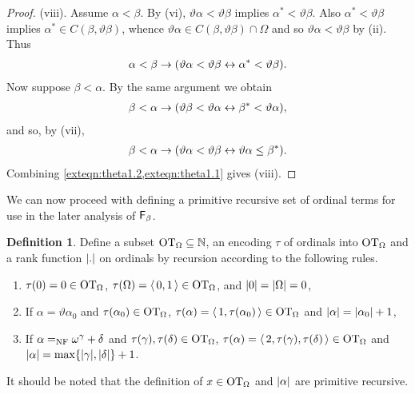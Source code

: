 \documentclass[UKenglish,cleveref,DIV=12]{scrartcl}
\theoremstyle{definition}
\newtheorem{definition}[lemma]{Definition}
\theoremstyle{definition}
\begin{document}
\begin{proof}
(viii). Assume $\alpha<\beta$. By (vi), $\vartheta\alpha<\vartheta\beta$ implies $\alpha^*<\vartheta\beta$. Also $\alpha^*<\vartheta\beta$ implies $\alpha^*\in C(\beta,\vartheta\beta)$, whence $\vartheta\alpha\in C(\beta,\vartheta\beta)\cap \Omega$ and so $\vartheta\alpha<\vartheta\beta$ by (ii). Thus
\begin{align}\label{exteqn:theta1.1}
 \alpha<\beta\rightarrow(\vartheta\alpha<\vartheta\beta \leftrightarrow \alpha^*<\vartheta\beta).
\end{align}
Now suppose $\beta<\alpha$. By the same argument we obtain
\begin{align*}
 \beta<\alpha \rightarrow(\vartheta\beta<\vartheta\alpha \leftrightarrow \beta^*<\vartheta\alpha),
\end{align*}
and so, by (vii),
\begin{align}\label{exteqn:theta1.2}
 \beta<\alpha \rightarrow(\vartheta\alpha<\vartheta\beta \leftrightarrow \vartheta\alpha\le\beta^*).
\end{align}
Combining \cref{exteqn:theta1.2,exteqn:theta1.1} gives (viii).
%
\end{proof}
We can now proceed with defining a primitive recursive set of ordinal terms for
use in the later analysis of $\mathsf{F}_\beta$.
\begin{definition} Define a subset $\mathrm{OT}_\Omega\subseteq\mathbb N$, an encoding $\tau$
of ordinals into $\mathrm{OT}_\Omega$ and a rank function $\lvert{.}\rvert$ on ordinals by
recursion according to the following rules.
\begin{enumerate}%
 \item $\tau(0)=0\in\mathrm{OT}_\Omega$, $\tau(\Omega)=\langle\,0,1\,\rangle\in\mathrm{OT}_\Omega$, and $\lvert{0}\rvert=\lvert{\Omega}\rvert=0$,
 \item If $\alpha=\vartheta\alpha_0$ and $\tau(\alpha_0)\in\mathrm{OT}_\Omega$, $\tau(\alpha)=\langle\,1,\tau(\alpha_0)\,\rangle\in\mathrm{OT}_\Omega$ and $\lvert{\alpha}\rvert=\lvert{\alpha_0}\rvert+1$,
 \item If $\alpha=_{\mathrm{NF}}\omega^\gamma+\delta$ and $\tau(\gamma),\tau(\delta)\in\mathrm{OT}_\Omega$, $\tau(\alpha)=\langle\,2,\tau(\gamma),\tau(\delta)\,\rangle\in\mathrm{OT}_\Omega$ and $\lvert{\alpha}\rvert=\max\{\lvert{\gamma}\rvert,\lvert{\delta}\rvert\}+1$.
\end{enumerate}
\end{definition}
It should be noted that the definition of $x\in\mathrm{OT}_\Omega$ and $\lvert{\alpha}\rvert$ are primitive recursive.
\end{document}
